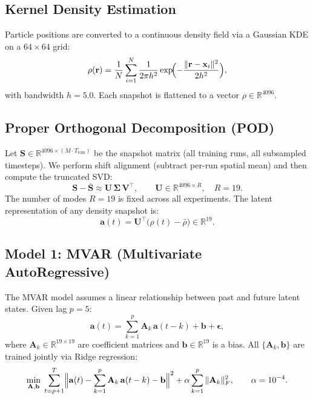 \documentclass[11pt]{article}
\newcommand{\R}{\mathbb{R}}
\newcommand{\bx}{\mathbf{x}}
\newcommand{\ba}{\mathbf{a}}
\newcommand{\bU}{\mathbf{U}}
\newcommand{\bA}{\mathbf{A}}
\begin{document}
\subsection{Kernel Density Estimation}

Particle positions are converted to a continuous density field via a
Gaussian KDE on a $64\times 64$ grid:
\begin{equation}
    \rho(\mathbf{r}) = \frac{1}{N}\sum_{i=1}^N
        \frac{1}{2\pi h^2}\exp\!\Bigl(-\frac{\|\mathbf{r}-\bx_i\|^2}{2h^2}\Bigr),
    \label{eq:kde}
\end{equation}
with bandwidth $h=5.0$.  Each snapshot is flattened to a vector
$\rho\in\R^{4096}$.

\subsection{Proper Orthogonal Decomposition (POD)}

Let $\mathbf{S}\in\R^{4096\times (M\cdot T_\mathrm{rom})}$ be the
snapshot matrix (all training runs, all subsampled timesteps).  We
perform shift alignment (subtract per-run spatial mean) and then compute
the truncated SVD:
\begin{equation}
    \mathbf{S} - \bar{\mathbf{S}}
    \approx \bU\,\boldsymbol{\Sigma}\,\mathbf{V}^\top,
    \qquad
    \bU\in\R^{4096\times R},\quad R=19.
    \label{eq:pod}
\end{equation}
The number of modes $R=19$ is fixed across all experiments.  The latent
representation of any density snapshot is:
\begin{equation}
    \ba(t) = \bU^\top\bigl(\rho(t) - \bar\rho\bigr) \in \R^{19}.
    \label{eq:project}
\end{equation}

\subsection{Model 1: MVAR (Multivariate AutoRegressive)}
\label{sec:mvar}

The MVAR model assumes a linear relationship between past and future
latent states.  Given lag $p=5$:
\begin{equation}
    \ba(t) = \sum_{k=1}^{p} \bA_k\, \ba(t-k) + \mathbf{b} + \boldsymbol{\epsilon},
    \label{eq:mvar}
\end{equation}
where $\bA_k\in\R^{19\times 19}$ are coefficient matrices and
$\mathbf{b}\in\R^{19}$ is a bias.  All $\{\bA_k, \mathbf{b}\}$ are
trained jointly via Ridge regression:
\begin{equation}
    \min_{\bA,\mathbf{b}}\;\sum_{t=p+1}^{T}
    \Bigl\|\ba(t) - \sum_{k=1}^p \bA_k\,\ba(t-k) - \mathbf{b}\Bigr\|^2
    + \alpha\sum_{k=1}^p\|\bA_k\|_F^2,
    \qquad \alpha=10^{-4}.
    \label{eq:ridge}
\end{equation}
\end{document}
